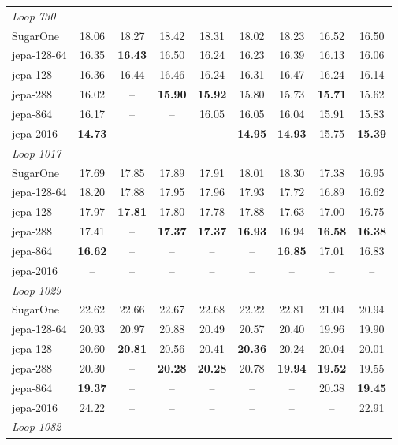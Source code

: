 \documentclass[11pt,a4paper]{article}
\begin{document}
\begin{tabular}{lcccccccc}
  \hline
  \multicolumn{9}{l}{\textit{Loop 730}} \\
  SugarOne & 18.06 & 18.27 & 18.42 & 18.31 & 18.02 & 18.23 & 16.52 & 16.50 \\
  jepa-128-64 & 16.35 & \textbf{16.43} & 16.50 & 16.24 & 16.23 & 16.39 & 16.13 & 16.06 \\
  jepa-128 & 16.36 & 16.44 & 16.46 & 16.24 & 16.31 & 16.47 & 16.24 & 16.14 \\
  jepa-288 & 16.02 & -- & \textbf{15.90} & \textbf{15.92} & 15.80 & 15.73 & \textbf{15.71} & 15.62 \\
  jepa-864 & 16.17 & -- & -- & 16.05 & 16.05 & 16.04 & 15.91 & 15.83 \\
  jepa-2016 & \textbf{14.73} & -- & -- & -- & \textbf{14.95} & \textbf{14.93} & 15.75 & \textbf{15.39} \\
  \hline
  \multicolumn{9}{l}{\textit{Loop 1017}} \\
  SugarOne & 17.69 & 17.85 & 17.89 & 17.91 & 18.01 & 18.30 & 17.38 & 16.95 \\
  jepa-128-64 & 18.20 & 17.88 & 17.95 & 17.96 & 17.93 & 17.72 & 16.89 & 16.62 \\
  jepa-128 & 17.97 & \textbf{17.81} & 17.80 & 17.78 & 17.88 & 17.63 & 17.00 & 16.75 \\
  jepa-288 & 17.41 & -- & \textbf{17.37} & \textbf{17.37} & \textbf{16.93} & 16.94 & \textbf{16.58} & \textbf{16.38} \\
  jepa-864 & \textbf{16.62} & -- & -- & -- & -- & \textbf{16.85} & 17.01 & 16.83 \\
  jepa-2016 & -- & -- & -- & -- & -- & -- & -- & -- \\
  \hline
  \multicolumn{9}{l}{\textit{Loop 1029}} \\
  SugarOne & 22.62 & 22.66 & 22.67 & 22.68 & 22.22 & 22.81 & 21.04 & 20.94 \\
  jepa-128-64 & 20.93 & 20.97 & 20.88 & 20.49 & 20.57 & 20.40 & 19.96 & 19.90 \\
  jepa-128 & 20.60 & \textbf{20.81} & 20.56 & 20.41 & \textbf{20.36} & 20.24 & 20.04 & 20.01 \\
  jepa-288 & 20.30 & -- & \textbf{20.28} & \textbf{20.28} & 20.78 & \textbf{19.94} & \textbf{19.52} & 19.55 \\
  jepa-864 & \textbf{19.37} & -- & -- & -- & -- & -- & 20.38 & \textbf{19.45} \\
  jepa-2016 & 24.22 & -- & -- & -- & -- & -- & -- & 22.91 \\
  \hline
  \multicolumn{9}{l}{\textit{Loop 1082}} \\

\end{tabular}
\end{document}
